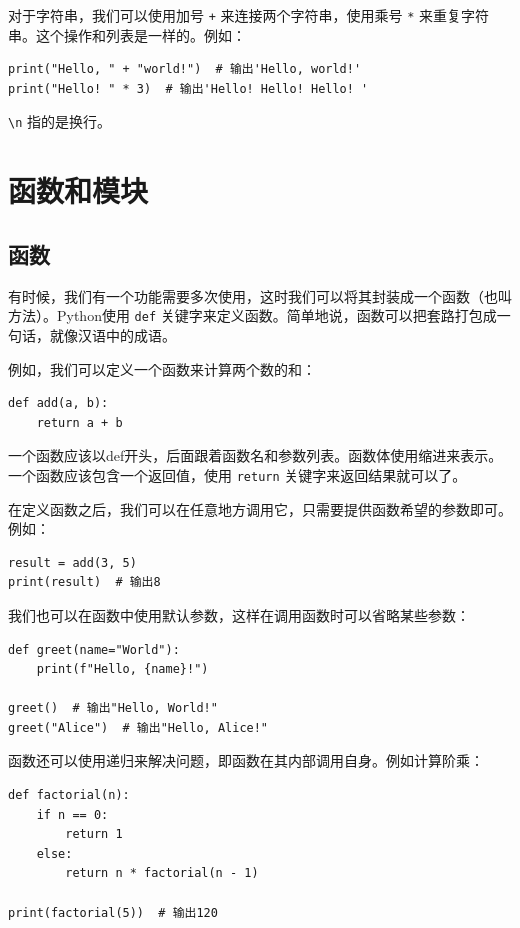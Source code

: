 对于字符串，我们可以使用加号 \texttt{+} 来连接两个字符串，使用乘号 \texttt{*} 来重复字符串。这个操作和列表是一样的。例如：
\begin{verbatim}
print("Hello, " + "world!")  # 输出'Hello, world!'
print("Hello! " * 3)  # 输出'Hello! Hello! Hello! '
\end{verbatim}

 \texttt{\textbackslash n} 指的是换行。

\section{函数和模块}\label{sec:functions-and-modules}

\subsection{函数}

有时候，我们有一个功能需要多次使用，这时我们可以将其封装成一个函数（也叫方法）。Python使用 \texttt{def} 关键字来定义函数。简单地说，函数可以把套路打包成一句话，就像汉语中的成语。

例如，我们可以定义一个函数来计算两个数的和：
\begin{verbatim}
def add(a, b):
    return a + b
\end{verbatim}

一个函数应该以def开头，后面跟着函数名和参数列表。函数体使用缩进来表示。一个函数应该包含一个返回值，使用 \texttt{return} 关键字来返回结果就可以了。

在定义函数之后，我们可以在任意地方调用它，只需要提供函数希望的参数即可。例如：
\begin{verbatim}
result = add(3, 5)
print(result)  # 输出8
\end{verbatim}

我们也可以在函数中使用默认参数，这样在调用函数时可以省略某些参数：
\begin{verbatim}
def greet(name="World"):
    print(f"Hello, {name}!")

greet()  # 输出"Hello, World!"
greet("Alice")  # 输出"Hello, Alice!"
\end{verbatim}

函数还可以使用递归来解决问题，即函数在其内部调用自身。例如计算阶乘：
\begin{verbatim}
def factorial(n):
    if n == 0:
        return 1
    else:
        return n * factorial(n - 1)

print(factorial(5))  # 输出120
\end{verbatim}

